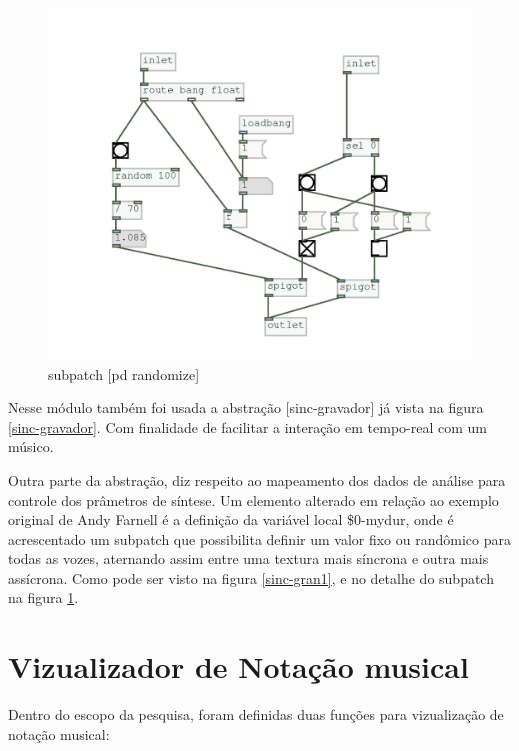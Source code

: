 \documentclass[draft]{ppgmus}
\begin{document}
\begin{figure}
\includegraphics[scale=.6]{sub-randomize}
\caption{subpatch [pd randomize]}
\label{sub-randomize}
\end{figure}


Nesse módulo também foi usada a abstração [sinc-gravador] já vista na figura \ref{sinc-gravador}.
Com finalidade de facilitar a interação em tempo-real com um músico.

Outra parte da abstração, diz respeito ao mapeamento dos dados de análise para controle
dos prâmetros de síntese. Um elemento alterado em relação ao exemplo original de Andy
Farnell é a definição da variável local \$0-mydur, onde é acrescentado um subpatch que 
possibilita definir um valor fixo ou randômico para todas as vozes, aternando assim entre
uma textura mais síncrona e outra mais assícrona. Como pode ser visto na figura \ref{sinc-gran1},
e no detalhe do subpatch na figura \ref{sub-randomize}.


\pagebreak





\section{Vizualizador de Notação musical}
\label{sec-notacao}



Dentro do escopo da pesquisa, foram definidas duas funções
para vizualização de notação musical:
\end{document}

